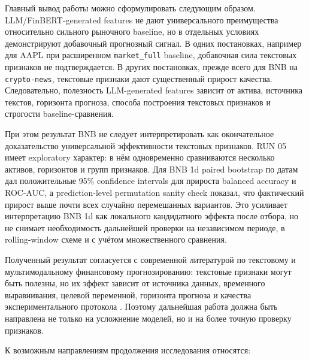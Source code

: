 Главный вывод работы можно сформулировать следующим образом. LLM/FinBERT-generated features не дают универсального преимущества относительно сильного рыночного baseline, но в отдельных условиях демонстрируют добавочный прогнозный сигнал. В одних постановках, например для AAPL при расширенном \texttt{market\_full} baseline, добавочная сила текстовых признаков не подтверждается. В других постановках, прежде всего для BNB на \texttt{crypto-news}, текстовые признаки дают существенный прирост качества. Следовательно, полезность LLM-generated features зависит от актива, источника текстов, горизонта прогноза, способа построения текстовых признаков и строгости baseline-сравнения.

При этом результат BNB не следует интерпретировать как окончательное доказательство универсальной эффективности текстовых признаков. RUN 05 имеет exploratory характер: в нём одновременно сравниваются несколько активов, горизонтов и групп признаков. Для BNB 1d paired bootstrap по датам дал положительные 95\% confidence intervals для прироста balanced accuracy и ROC-AUC, а prediction-level permutation sanity check показал, что фактический прирост выше почти всех случайно перемешанных вариантов. Это усиливает интерпретацию BNB 1d как локального кандидатного эффекта после отбора, но не снимает необходимость дальнейшей проверки на независимом периоде, в rolling-window схеме и с учётом множественного сравнения.

Полученный результат согласуется с современной литературой по текстовому и мультимодальному финансовому прогнозированию: текстовые признаки могут быть полезны, но их эффект зависит от источника данных, временного выравнивания, целевой переменной, горизонта прогноза и качества экспериментального протокола \cite{hiew2019bert,zou2022prebit,jiang2023finbert,albada2025bertweet,vuong2025llm}. Поэтому дальнейшая работа должна быть направлена не только на усложнение моделей, но и на более точную проверку признаков.

К возможным направлениям продолжения исследования относятся:

